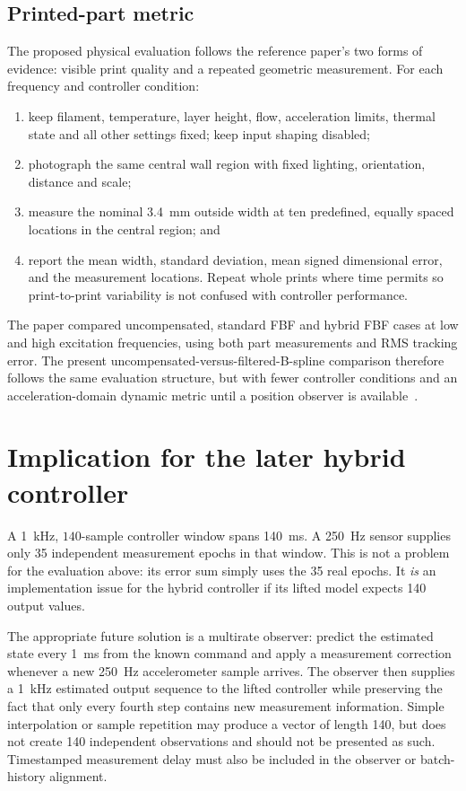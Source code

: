 \documentclass[11pt,a4paper]{article}
\begin{document}
\subsection{Printed-part metric}

The proposed physical evaluation follows the reference paper's two forms of
evidence: visible print quality and a repeated geometric measurement.  For each
frequency and controller condition:

\begin{enumerate}
    \item keep filament, temperature, layer height, flow, acceleration limits,
    thermal state and all other settings fixed; keep input shaping disabled;
    \item photograph the same central wall region with fixed lighting,
    orientation, distance and scale;
    \item measure the nominal \SI{3.4}{mm} outside width at ten predefined,
    equally spaced locations in the central region; and
    \item report the mean width, standard deviation, mean signed dimensional
    error, and the measurement locations.  Repeat whole prints where time
    permits so print-to-print variability is not confused with controller
    performance.
\end{enumerate}

The paper compared uncompensated, standard FBF and hybrid FBF cases at low and
high excitation frequencies, using both part measurements and RMS tracking
error.  The present uncompensated-versus-filtered-B-spline comparison therefore
follows the same evaluation structure, but with fewer controller conditions and
an acceleration-domain dynamic metric until a position observer is
available~\cite{chou2022}.

\section{Implication for the later hybrid controller}

A \SI{1}{kHz}, \(140\)-sample controller window spans \SI{140}{ms}.  A
\SI{250}{Hz} sensor supplies only 35 independent measurement epochs in that
window.  This is not a problem for the evaluation above: its error sum simply
uses the 35 real epochs.  It \emph{is} an implementation issue for the hybrid
controller if its lifted model expects 140 output values.

The appropriate future solution is a multirate observer: predict the estimated
state every \SI{1}{ms} from the known command and apply a measurement correction
whenever a new \SI{250}{Hz} accelerometer sample arrives.  The observer then
supplies a \SI{1}{kHz} estimated output sequence to the lifted controller while
preserving the fact that only every fourth step contains new measurement
information.  Simple interpolation or sample repetition may produce a vector
of length 140, but does not create 140 independent observations and should not
be presented as such.  Timestamped measurement delay must also be included in
the observer or batch-history alignment.
\end{document}
